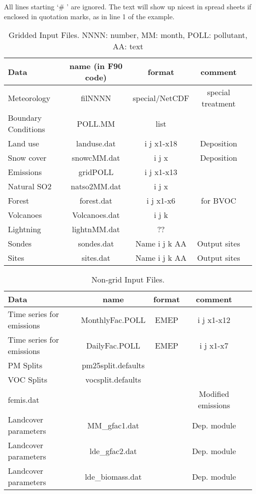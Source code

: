  All lines starting `\# ' are ignored. The text will show up nicest in
 spread sheets if enclosed in quotation marks, as in line 1 of the example.

\begin{table}[h]
\caption{Gridded Input Files. NNNN: number, MM: month, POLL: pollutant, AA: text}
\label{Tab:GridInputs}
\begin{tabular}{lcccc}\hline
Data & name (in F90 code) & format& comment\\ \hline
Meteorology&filNNNN&special/NetCDF& special treatment \\
Boundary Conditions&POLL.MM&list&\\
Land use&landuse.dat&i j x1-x18& Deposition \\ %
Snow cover&snowcMM.dat&i j x& Deposition\\
Emissions&gridPOLL&i j x1-x13&\\
Natural SO2&natso2MM.dat&i j x&\\
Forest&forest.dat&i j x1-x6&for BVOC \\ %
Volcanoes&Volcanoes.dat&i j k&   \\ %
Lightning&lightnMM.dat&??& \\
Sondes&sondes.dat& Name i j k AA& Output sites\\
Sites&sites.dat  & Name i j k AA& Output sites\\ \hline
\end{tabular}
\end{table}
 

\begin{table}[h]
\caption{Non-grid Input Files.}
\label{Tab:Inputs}
\begin{tabular}{lcccc}\hline
Data & name   &format& comment\\ \hline
Time series for emissions&MonthlyFac.POLL&EMEP&i j x1-x12&\\
Time series for emissions&DailyFac.POLL&EMEP&i j x1-x7&\\
PM Splits                   &pm25split.defaults&& \\
VOC Splits&vocsplit.defaults&& \\
femis.dat           &             & & Modified emissions \\
Landcover parameters&MM\_gfac1.dat&& Dep. module \\
Landcover parameters&lde\_gfac2.dat&& Dep. module \\
Landcover parameters&lde\_biomass.dat&&Dep. module  \\\hline
\end{tabular}
\end{table}
